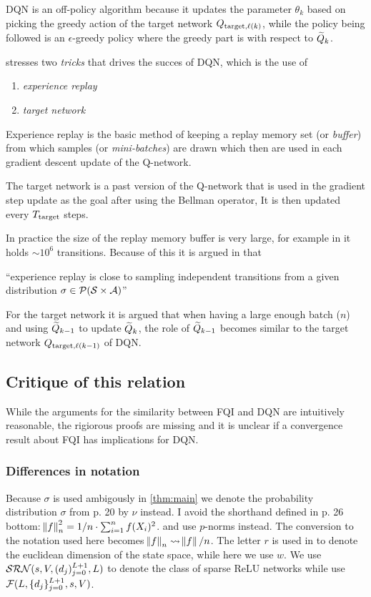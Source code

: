 DQN is an off-policy algorithm because it updates the
parameter $\theta_k$ based on picking the greedy action of the
target network $Q_{\mathrm{target}, \ell(k)}$, while the policy being
followed is an $\epsilon$-greedy policy where the greedy part is
with respect to $\widetilde{Q}_k$.

 stresses two \emph{tricks} that drives the succes of DQN,
which is the use of
\begin{enumerate}
  \item \emph{experience replay}
  \item \emph{target network}
\end{enumerate}
Experience replay is the basic method of keeping a replay memory
set (or \emph{buffer}) from which samples (or \emph{mini-batches}) are
drawn which then are used in each gradient descent update of the
Q-network.

The target network is a past version of the Q-network that is used
in the gradient step update as the goal after using the Bellman operator,
It is then updated every $T_{\mathrm{target}}$ steps.

In practice the size of the replay memory buffer is very large, for example
in  it holds $\sim 10^6$ transitions.
Because of this it is argued in  that
\begin{displayquote}
``experience replay is close to sampling independent transitions
from a given distribution $\sigma \in \mathcal{P}(\mathcal{S} \times \mathcal{A})$''
\end{displayquote}
For the target network it is argued that when having a large enough batch
($n$) and using $\widetilde{Q}_{k-1}$ to update $\widetilde{Q}_k$, the role of
$\widetilde{Q}_{k-1}$ becomes similar to the target network
$Q_{\mathrm{target}, \ell(k-1)}$ of DQN.

\subsection{Critique of this relation}

While the arguments for the similarity between FQI and DQN are intuitively
reasonable, the rigiorous proofs are missing and it is unclear if
a convergence result about FQI has implications for DQN.

\subsubsection{Differences in notation}

Because $\sigma$ is used ambigously in \cref{thm:main}
we denote the probability distribution $\sigma$
from  p. 20 by $\nu$ instead.
I avoid the shorthand defined in
 p. 26 bottom:
$\norm{f}_n^2 = 1/n \cdot \sum_{i=1}^n f(X_i)^2$.
and use $p$-norms instead.
The conversion to the notation used here becomes
$\norm{f}_n \leadsto \norm{f}/n$.
The letter $r$ is used in  to denote the euclidean dimension of
the state space, while here we use $w$.
We use $\mathcal{SRN}(s, V, (d_j)_{j=0}^{L+1}, L)$
  to denote the class of sparse ReLU networks while
 use $\mathcal{F}(L, \{d_j\}_{j=0}^{L+1}, s, V)$.
